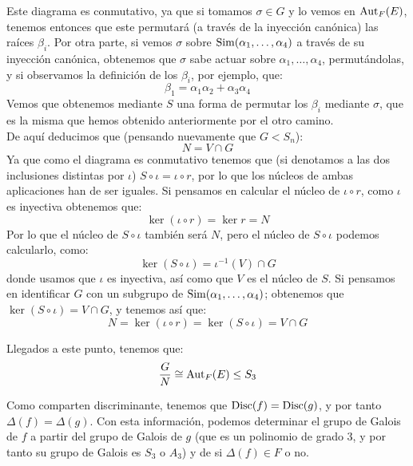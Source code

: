 \begin{ejemplo}
    \noindent
    Este diagrama es conmutativo, ya que si tomamos $\sigma\in G$ y lo vemos en $\operatorname{Aut}_F(E)$, tenemos entonces que este permutará (a través de la inyección canónica) las raíces $\beta_i$. Por otra parte, si vemos $\sigma$ sobre $\operatorname{Sim}(\alpha_1,\ldots,\alpha_4)$ a través de su inyección canónica, obtenemos que $\sigma$ sabe actuar sobre $\alpha_1,\ldots,\alpha_4$, permutándolas, y si observamos la definición de los $\beta_i$, por ejemplo, que:
    \begin{equation*}
        \beta_1 = \alpha_1 \alpha_2 + \alpha_3 \alpha_4
    \end{equation*}
    Vemos que obtenemos mediante $S$ una forma de permutar los $\beta_i$ mediante $\sigma$, que es la misma que hemos obtenido anteriormente por el otro camino.\\

    \noindent
    De aquí deducimos que (pensando nuevamente que $G<S_n$): 
    \begin{equation*}
        N = V\cap G
    \end{equation*}
    Ya que como el diagrama es conmutativo tenemos que (si denotamos a las dos inclusiones distintas por $\iota$) $S\circ \iota = \iota\circ r$, por lo que los núcleos de ambas aplicaciones han de ser iguales. Si pensamos en calcular el núcleo de $\iota\circ r$, como $\iota$ es inyectiva obtenemos que:
    \begin{equation*}
        \ker(\iota \circ r) = \ker r = N
    \end{equation*}
    Por lo que el núcleo de $S\circ\iota$ también será $N$, pero el núcleo de $S\circ \iota$ podemos calcularlo, como:
    \begin{equation*}
        \ker (S\circ \iota) = \iota^{-1}(V)\cap G
    \end{equation*}
    donde usamos que $\iota$ es inyectiva, así como que $V$ es el núcleo de $S$. Si pensamos en identificar $G$ con un subgrupo de $\operatorname{Sim}(\alpha_1,\ldots,\alpha_4)$; obtenemos que $\ker (S\circ \iota) = V\cap G$, y tenemos así que:
    \begin{equation*}
        N = \ker(\iota \circ r) = \ker(S\circ \iota) = V\cap G
    \end{equation*}

    Llegados a este punto, tenemos que:
    \begin{equation*}
        \frac{G}{N} \cong \operatorname{Aut}_F(E) \leq S_3
    \end{equation*}
    
    Como comparten discriminante, tenemos que $\operatorname{Disc}(f) = \operatorname{Disc}(g)$, y por tanto $\Delta(f) = \Delta(g)$. Con esta información, podemos determinar el grupo de Galois de $f$ a partir del grupo de Galois de $g$ (que es un polinomio de grado 3, y por tanto su grupo de Galois es $S_3$ o $A_3$) y de si $\Delta(f)\in F$ o no.
\end{ejemplo}

